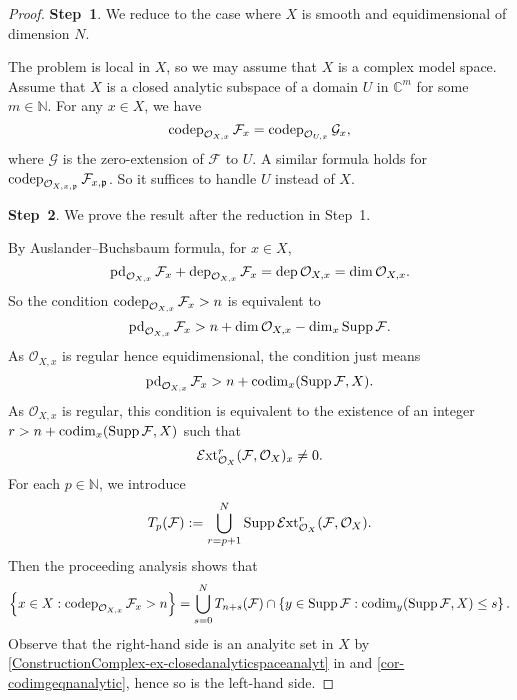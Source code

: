 \begin{proof}
    \textbf{Step~1}. We reduce to the case where $X$ is smooth and equidimensional of dimension $N$.

    The problem is local in $X$, so we may assume that $X$ is a complex model space. Assume that $X$ is a closed analytic subspace of a domain $U$ in $\mathbb{C}^m$ for some $m\in \mathbb{N}$. For any $x\in X$, we have
    \[
        \operatorname{codep}_{\mathcal{O}_{X,x}}\mathcal{F}_x=\operatorname{codep}_{\mathcal{O}_{U,x}}\mathcal{G}_x,
    \]
    where $\mathcal{G}$ is the zero-extension of $\mathcal{F}$ to $U$. A similar formula holds for $\operatorname{codep}_{\mathcal{O}_{X,x,\mathfrak{p}}}\mathcal{F}_{x,\mathfrak{p}}$. So it suffices to handle $U$ instead of $X$.

    \textbf{Step~2}. We prove the result after the reduction in Step~1.

    By Auslander--Buchsbaum formula, for $x\in X$,
    \[
        \operatorname{pd}_{\mathcal{O}_{X,x}} \mathcal{F}_x+\operatorname{dep}_{\mathcal{O}_{X,x}} \mathcal{F}_x=\operatorname{dep} \mathcal{O}_{X,x}=\dim \mathcal{O}_{X,x}.
    \]
    So the condition $\operatorname{codep}_{\mathcal{O}_{X,x}} \mathcal{F}_x>n$ is equivalent to
    \[
        \operatorname{pd}_{\mathcal{O}_{X,x}} \mathcal{F}_x> n+\dim \mathcal{O}_{X,x}-\dim_x \operatorname{Supp}\mathcal{F}.
    \]
    As $\mathcal{O}_{X,x}$ is regular hence equidimensional, the condition just means
    \[
        \operatorname{pd}_{\mathcal{O}_{X,x}} \mathcal{F}_x> n+\operatorname{codim}_x(\operatorname{Supp} \mathcal{F}, X).
    \]
    As $\mathcal{O}_{X,x}$ is regular, this condition is equivalent to the existence of an integer $r>n+\operatorname{codim}_x(\operatorname{Supp} \mathcal{F}, X)$ such that
    \[
        \mathcal{E}\mathrm{xt}_{\mathcal{O}_X}^r(\mathcal{F},\mathcal{O}_X)_x\neq 0.  
    \]
    For each $p\in \mathbb{N}$, we introduce
    \[
        T_p(\mathcal{F}):=\bigcup_{r=p+1}^{N}\operatorname{Supp} \mathcal{E}\mathrm{xt}_{\mathcal{O}_X}^r(\mathcal{F},\mathcal{O}_X).  
    \]
    Then the proceeding analysis shows that 
    \[
        \left\{x\in X: \operatorname{codep}_{\mathcal{O}_{X,x}}\mathcal{F}_x> n \right\}=\bigcup_{s=0}^{N} T_{n+s}(\mathcal{F})\cap \left\{y\in \operatorname{Supp} \mathcal{F}:\operatorname{codim}_y(\operatorname{Supp} \mathcal{F},X)\leq s\right\}.
    \]
    Observe that the right-hand side is an analyitc set in $X$ by  \cref{ConstructionComplex-ex-closedanalyticspaceanalyt} in  and \cref{cor-codimgeqnanalytic}, hence so is the left-hand side.


\end{proof}
